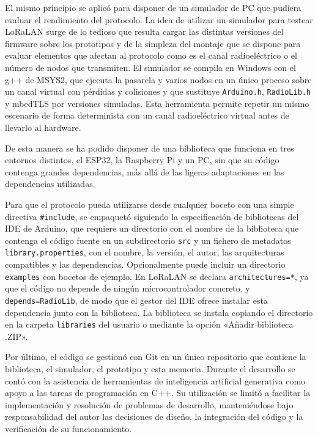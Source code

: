 El mismo principio se aplicó para disponer de un simulador de PC que pudiera evaluar el rendimiento del protocolo. La idea de utilizar un simulador para testear LoRaLAN surge de lo tedioso que resulta cargar las distintas versiones del firmware sobre los prototipos y de la simpleza del montaje que se dispone para evaluar elementos que afectan al protocolo como es el canal radioeléctrico o el número de nodos que transmiten. El simulador se compila en Windows con el g++ de MSYS2, que ejecuta la pasarela y varios nodos en un único proceso sobre un canal virtual con pérdidas y colisiones y que sustituye \texttt{Arduino.h}, \texttt{RadioLib.h} y mbedTLS por versiones simuladas. Esta herramienta permite repetir un mismo escenario de forma determinista con un canal radioeléctrico virtual antes de llevarlo al hardware.

De esta manera se ha podido disponer de una biblioteca que funciona en tres entornos distintos, el ESP32, la Raspberry Pi y un PC, sin que su código contenga grandes dependencias, más allá de las ligeras adaptaciones en las dependencias utilizadas. 

Para que el protocolo pueda utilizarse desde cualquier boceto con una simple directiva \texttt{\#include}, se empaquetó siguiendo la especificación de bibliotecas del IDE de Arduino, que requiere un directorio con el nombre de la biblioteca que contenga el código fuente en un subdirectorio \texttt{src} y un fichero de metadatos \texttt{library.properties}, con el nombre, la versión, el autor, las arquitecturas compatibles y las dependencias. Opcionalmente puede incluir un directorio \texttt{examples} con bocetos de ejemplo. En LoRaLAN se declara \texttt{architectures=*}, ya que el código no depende de ningún microcontrolador concreto, y \texttt{depends=RadioLib}, de modo que el gestor del IDE ofrece instalar esta dependencia junto con la biblioteca. La biblioteca se instala copiando el directorio en la carpeta \texttt{libraries} del usuario o mediante la opción «Añadir biblioteca .ZIP».

Por último, el código se gestionó con Git en un único repositorio que contiene la biblioteca, el simulador, el prototipo y esta memoria. Durante el desarrollo se contó con la asistencia de herramientas de inteligencia artificial generativa como apoyo a las tareas de programación en C++. Su utilización se limitó a facilitar la implementación y resolución de problemas de desarrollo, manteniéndose bajo responsabilidad del autor las decisiones de diseño, la integración del código y la verificación de su funcionamiento.

